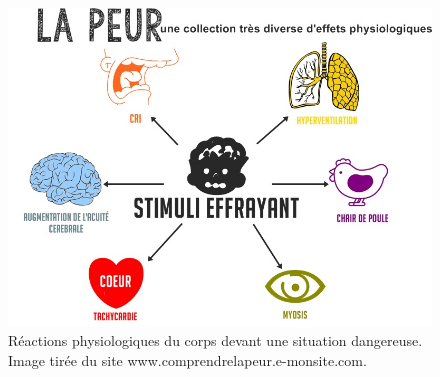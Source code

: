 \begin{figure}[h]
  \centering
  \includegraphics[width=12cm]{./Chapitre1/figures/peur.jpg}
  \caption{Réactions physiologiques du corps devant une situation dangereuse. Image tirée du site www.comprendrelapeur.e-monsite.com.}
  \label{fig:peur}
\end{figure}
